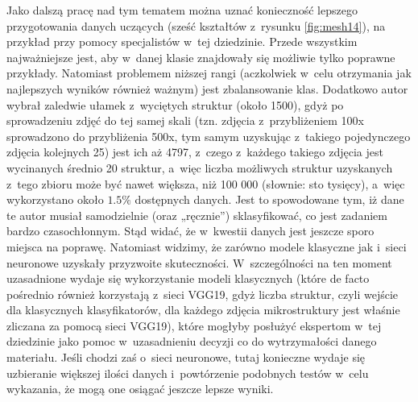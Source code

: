 Jako dalszą pracę nad tym tematem można uznać konieczność lepszego przygotowania danych uczących (sześć kształtów z~rysunku \ref{fig:mesh14}), na przykład przy pomocy specjalistów w~tej dziedzinie. Przede wszystkim najważniejsze jest, aby w~danej klasie znajdowały się możliwie tylko poprawne przykłady. Natomiast problemem niższej rangi (aczkolwiek w~celu otrzymania jak najlepszych wyników również ważnym) jest zbalansowanie klas. Dodatkowo autor wybrał zaledwie ułamek z~wyciętych struktur (około 1500), gdyż po sprowadzeniu zdjęć do tej samej skali (tzn. zdjęcia z~przybliżeniem 100x sprowadzono do przybliżenia 500x, tym samym uzyskując z~takiego pojedynczego zdjęcia kolejnych 25) jest ich aż 4797, z~czego z~każdego takiego zdjęcia jest wycinanych średnio 20 struktur, a~więc liczba możliwych struktur uzyskanych z~tego zbioru może być nawet większa, niż 100 000 (słownie: sto tysięcy), a~więc wykorzystano około $1.5\%$ dostępnych danych. Jest to spowodowane tym, iż dane te autor musiał samodzielnie (oraz „ręcznie”) sklasyfikować, co jest zadaniem bardzo czasochłonnym. Stąd widać, że w~kwestii danych jest jeszcze sporo miejsca na poprawę. Natomiast widzimy, że zarówno modele klasyczne jak i~sieci neuronowe uzyskały przyzwoite skuteczności. W~szczególności na ten moment uzasadnione wydaje się wykorzystanie modeli klasycznych (które de facto pośrednio również korzystają z~sieci VGG19, gdyż liczba struktur, czyli wejście dla klasycznych klasyfikatorów, dla każdego zdjęcia mikrostruktury jest właśnie zliczana za pomocą sieci VGG19), które mogłyby posłużyć ekspertom w~tej dziedzinie jako pomoc w~uzasadnieniu decyzji co do wytrzymałości danego materiału. Jeśli chodzi zaś o~sieci neuronowe, tutaj konieczne wydaje się uzbieranie większej ilości danych i~powtórzenie podobnych testów w~celu wykazania, że mogą one osiągać jeszcze lepsze wyniki. 